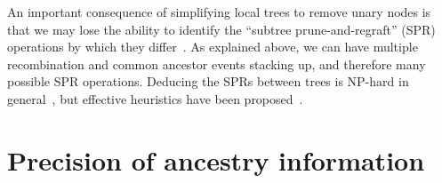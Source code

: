 \documentclass{article}
\begin{document}
An important consequence of simplifying local trees to remove
unary nodes is that we may lose the ability to identify
the ``subtree prune-and-regraft'' (SPR) operations
by which they differ~\citep{hein1990reconstructing,song2003on,song2006properties}.
As explained above, we can have multiple recombination and
common ancestor events stacking up, and therefore
many possible SPR operations. Deducing the SPRs between
trees is NP-hard in
general~\citep{hein1996complexity,allen2001subtree,bordewich2005computational},
but effective heuristics have been proposed~\citep{rasmussen2022espalier}.




\section*{Precision of ancestry information}
\end{document}
